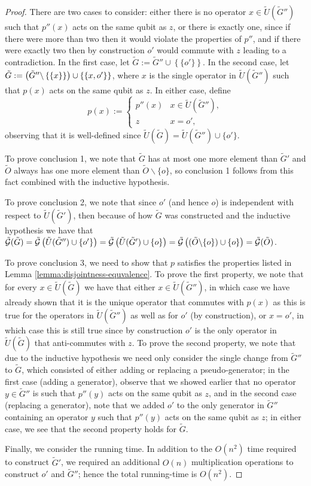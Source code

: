 \documentclass[twocolumn,showpacs,preprintnumbers,amsmath,amssymb,nofootinbib,pra,floatfix]{revtex4-1}
\newcommand{\set}{\tilde}
\newcommand{\genfun}{\tilde{\mathcal{G}}}
\begin{document}
\begin{proof}
There are two cases to consider:  either there is no operator $x\in\set U(\set G'')$ such that $p''(x)$ acts on the same qubit as $z$, or there is exactly one, since if there were more than two then it would violate the properties of $p''$, and if there were exactly two then by construction $o'$ would commute with $z$ leading to a contradiction.  In the first case, let $\set G:=\set G''\cup\left\{\{o'\}\right\}$.  In the second case, let $\set G:=\paren{\set G''\backslash\left\{\{x\}\right\}}\cup\left\{\{x,o'\}\right\}$, where $x$ is the single operator in $\set U(\set G'')$ such that $p(x)$ acts on the same qubit as $z$.   In either case, define
$$
p(x) :=
\begin{cases}
p''(x) & x\in \set U(\set G''), \\
z & x=o',
\end{cases}
$$
observing that it is well-defined since $\set U(\set G)=\set U(\set G'')\cup\{o'\}$.

To prove conclusion 1, we note that $\set G$ has at most one more element than $\set G'$ and $\set O$ always has one more element than $\set O\backslash\{o\}$, so conclusion 1 follows from this fact combined with the inductive hypothesis.

To prove conclusion 2, we note that since $o'$ (and hence $o$) is independent with respect to $\set U(\set G')$, then because of how $\set G$ was constructed and the inductive hypothesis we have that $\genfun(\set G)=\genfun\paren{\set U(\set G'')\cup\{o'\}}=\genfun\paren{\set U(\set G')\cup\{o\}}=\genfun\paren{(\set O\backslash\{o\})\cup\{o\}}=\genfun(\set O)$.

To prove conclusion 3, we need to show that $p$ satisfies the properties listed in Lemma \ref{lemma:disjointness-equvalence}.  To prove the first property, we note that for every $x\in\set U(\set G)$ we have that either $x\in\set U(\set G'')$, in which case we have already shown that it is the unique operator that commutes with $p(x)$ as this is true for the operators in $\set U(\set G'')$ as well as for $o'$ (by construction), or $x=o'$, in which case this is still true since by construction $o'$ is the only operator in $\set U(\set G)$ that anti-commutes with $z$.  To prove the second property, we note that due to the inductive hypothesis we need only consider the single change from $\set G''$ to $\set G$, which consisted of either adding or replacing a pseudo-generator;  in the first case (adding a generator), observe that we showed earlier that no operator $y\in\set G''$ is such that $p''(y)$ acts on the same qubit as $z$, and in the second case (replacing a generator), note that we added $o'$ to the only generator in $\set G''$ containing an operator $y$ such that $p''(y)$ acts on the same qubit as $z$;  in either case, we see that the second property holds for $\set G$.

Finally, we consider the running time.  In addition to the $O(n^2)$ time required to construct $\set G'$, we required an additional $O(n)$ multiplication operations to construct $o'$ and $\set G''$;  hence the total running-time is $O(n^2)$.
\end{proof}
\end{document}
